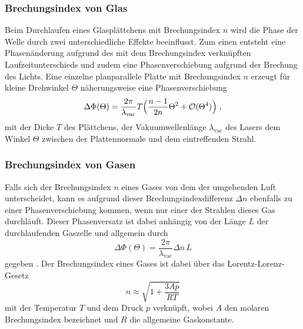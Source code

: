 \subsubsection{Brechungsindex von Glas}
Beim Durchlaufen eines Glasplättchens mit Brechungsindex $n$ wird die Phase der Welle durch zwei
unterschiedliche Effekte beeinflusst. Zum einen entsteht eine Phasenänderung aufgrund
des mit dem Brechungsindex verknüpften Laufzeitunterschieds und zudem eine
Phasenverschiebung aufgrund der Brechung des Lichts. Eine einzelne planparallele Platte
mit Brechungsindex $n$ erzeugt für kleine Drehwinkel $\Theta$  näherungsweise eine Phasenverschiebung \cite{skript}
\begin{equation}
\Delta \Phi(\Theta)=\frac{2\pi}{\lambda_{\text{vac}}}T\Bigl(\frac{n-1}{2n}\Theta^2+\mathcal{O}(\Theta^4)   \Bigr) \; ,
\label{eq:pM}
\end{equation}
mit der Dicke $T$ des Plättchens, der Vakuumwellenlänge $\lambda_{\text{vac}}$ des Lasers dem Winkel $\Theta$
zwischen der Plattennormale und dem eintreffenden Strahl.

\subsubsection{Brechungsindex von Gasen}
Falls sich der Brechungsindex $n$ eines Gases von dem der umgebenden Luft unterscheidet, kann es
aufgrund dieser Brechungsindexdifferenz $\Delta n$ ebenfalls zu einer Phasenverschiebung
kommen, wenn nur einer der Strahlen dieses Gas durchläuft.
Dieser Phasenversatz ist dabei anhängig von der Länge $L$
der durchlaufenden Gaszelle und allgemein durch \cite{skript}
\begin{equation}
\Delta \Phi(\Theta)=\frac{2\pi}{\lambda_{\text{vac}}} \Delta n\,L
\label{eq:pM}
\end{equation}
gegeben \cite{skript}. Der Brechungsindex eines Gases ist dabei über das Lorentz-Lorenz-Gesetz
\begin{equation}
  n \approx \sqrt{1+ \frac{3Ap}{RT}}
\end{equation}
mit der Temperatur $T$ und dem Druck $p$ verknüpft, wobei $A$ den molaren Brechungsindex
bezeichnet und $R$ die allgemeine Gaskonstante.
